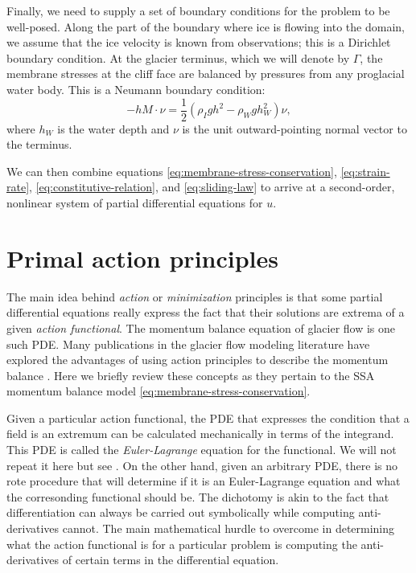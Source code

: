\documentclass{article}
\theoremstyle{definition}
\theoremstyle{plain}
\begin{document}
Finally, we need to supply a set of boundary conditions for the problem to be well-posed.
Along the part of the boundary where ice is flowing into the domain, we assume that the ice velocity is known from observations; this is a Dirichlet boundary condition.
At the glacier terminus, which we will denote by $\Gamma$, the membrane stresses at the cliff face are balanced by pressures from any proglacial water body.
This is a Neumann boundary condition:
\begin{equation}
    -hM\cdot\nu = \frac{1}{2}\left(\rho_Igh^2 - \rho_Wgh_W^2\right)\nu,
    \label{eq:terminus-bc}
\end{equation}
where $h_W$ is the water depth and $\nu$ is the unit outward-pointing normal vector to the terminus.

We can then combine equations \eqref{eq:membrane-stress-conservation}, \eqref{eq:strain-rate}, \eqref{eq:constitutive-relation}, and \eqref{eq:sliding-law} to arrive at a second-order, nonlinear system of partial differential equations for $u$.



\section{Primal action principles}
\label{sec:primal-action-principles}

The main idea behind \emph{action} or \emph{minimization} principles is that some partial differential equations really express the fact that their solutions are extrema of a given \emph{action functional}.
The momentum balance equation of glacier flow is one such PDE.
Many publications in the glacier flow modeling literature have explored the advantages of using action principles to describe the momentum balance \citep{bassis2010hamilton, dukowicz2010consistent, brinkerhoff2013data, shapero2021icepack}.
Here we briefly review these concepts as they pertain to the SSA momentum balance model \eqref{eq:membrane-stress-conservation}.

Given a particular action functional, the PDE that expresses the condition that a field is an extremum can be calculated mechanically in terms of the integrand.
This PDE is called the \emph{Euler-Lagrange} equation for the functional.
We will not repeat it here but see \citet{weinstock1974calculus}.
On the other hand, given an arbitrary PDE, there is no rote procedure that will determine if it is an Euler-Lagrange equation and what the corresonding functional should be.
The dichotomy is akin to the fact that differentiation can always be carried out symbolically while computing anti-derivatives cannot.
The main mathematical hurdle to overcome in determining what the action functional is for a particular problem is computing the anti-derivatives of certain terms in the differential equation.
\end{document}
